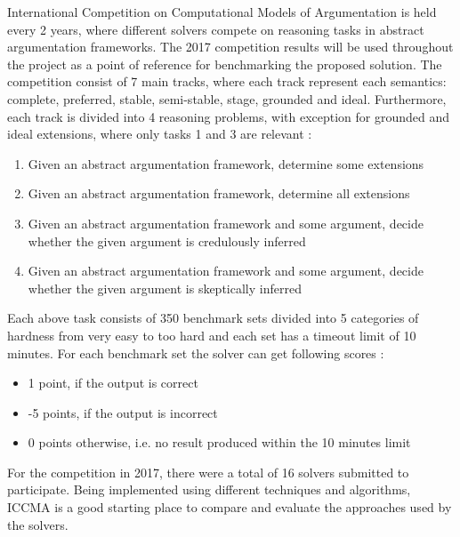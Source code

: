 International Competition on Computational Models of Argumentation is held every 2 years, where different solvers compete on reasoning tasks in abstract argumentation frameworks. The 2017 competition results will be used throughout the project as a point of reference for benchmarking the proposed solution. The competition consist of 7 main tracks, where each track represent each semantics: complete, preferred, stable, semi-stable, stage, grounded and ideal. Furthermore, each track is divided into 4 reasoning problems, with exception for grounded and ideal extensions, where only tasks 1 and 3 are relevant \citep{ICCMA2017}:
\begin{enumerate}
	\item{Given an abstract argumentation framework, determine some extensions}
	\item{Given an abstract argumentation framework, determine all extensions}
	\item{Given an abstract argumentation framework and some argument, decide whether the given argument is credulously inferred}
	\item{Given an abstract argumentation framework and some argument, decide whether the given argument is skeptically inferred}
\end{enumerate}
Each above task consists of 350 benchmark sets divided into 5 categories of hardness from very easy to too hard and each set has a timeout limit of 10 minutes. For each benchmark set the solver can get following scores \citep{results_sildes}:
\begin{itemize}
	\item{1 point, if the output is correct}
	\item{-5 points, if the output is incorrect}
	\item{0 points otherwise, i.e. no result produced within the 10 minutes limit}
\end{itemize}
For the competition in 2017, there were a total of 16 solvers submitted to participate. Being implemented using different techniques and algorithms, ICCMA is a good starting place to compare and evaluate the approaches used by the solvers.

